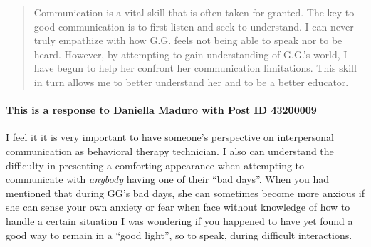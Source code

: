 \begin{quotation}
      Communication is a vital skill that is often taken for granted. The key to
        good communication is to first listen and seek to understand. I can
        never truly empathize with how G.G. feels not being able to speak nor to
        be heard.  However, by attempting to gain understanding of G.G.’s world,
        I have begun to help her confront her communication limitations. This
        skill in turn allows me to better understand her and to be a better
        educator.
    \end{quotation}

    \paragraph{This is a response to Daniella Maduro with Post ID 43200009}
    I feel it it is very important to have someone's perspective on
      interpersonal communication as behavioral therapy technician. I also can
      understand the difficulty in presenting a comforting appearance when
      attempting to communicate with \textit{anybody} having one of their
      ``bad days''. When you had mentioned that during GG's bad days, she can
      sometimes become more anxious if she can sense your own anxiety or fear
      when face without knowledge of how to handle a certain situation I was
      wondering if you happened to have yet found a good way to remain in a
      ``good light'', so to speak, during difficult interactions.
